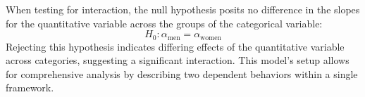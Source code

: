 \documentclass{article}
\begin{document}
When testing for interaction, the null hypothesis posits no difference in the slopes for the quantitative variable across the groups of the categorical variable:
\[
H_0: \alpha_{\text{men}} = \alpha_{\text{women}}
\]
Rejecting this hypothesis indicates differing effects of the quantitative variable across categories, suggesting a significant interaction. This model's setup allows for comprehensive analysis by describing two dependent behaviors within a single framework.
\end{document}
